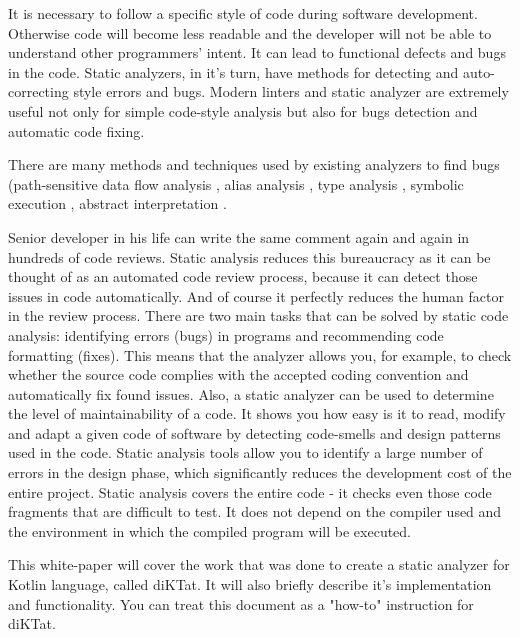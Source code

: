 It is necessary to follow a specific style of code during software development. Otherwise code will become less readable and the developer will not be able to  understand other programmers’ intent. It can lead to functional defects and bugs in the code. Static analyzers, in it's turn, have methods for detecting and auto-correcting style errors and bugs. Modern linters and static analyzer are extremely useful not only for simple code-style analysis but also for bugs detection and automatic code fixing.

There are many methods and techniques used by existing analyzers to ﬁnd bugs (path-sensitive data ﬂow analysis \cite{ref:kremenek}, alias analysis \cite{ref:effective}, type analysis \cite{ref:simple}, symbolic execution \cite{ref:dis}, abstract interpretation \cite{ref:dis}.

Senior developer in his life can write the same comment again and again in hundreds of code reviews. Static analysis reduces this bureaucracy as it can be thought of as an automated code review process, because it can detect those issues in code automatically. And of course it perfectly reduces the human factor in the review process. There are two main tasks that can be solved by static code analysis: identifying errors (bugs) in programs and recommending code formatting (fixes). This means that the analyzer allows you, for example, to check whether the source code complies with the accepted coding convention and automatically fix found issues. Also, a static analyzer can be used to determine the level of maintainability of a code. It shows you how easy is it to read, modify and adapt a given code of software by detecting code-smells and design patterns used in the code. Static analysis tools allow you to identify a large number of errors in the design phase, which significantly reduces the development cost of the entire project. Static analysis covers the entire code - it checks even those code fragments that are difficult to test. It does not depend on the compiler used and the environment in which the compiled program will be executed.

This white-paper will cover the work that was done to create a static analyzer for Kotlin language, called diKTat. It will also briefly describe it's implementation and functionality. You can treat this document as a "how-to" instruction for diKTat.